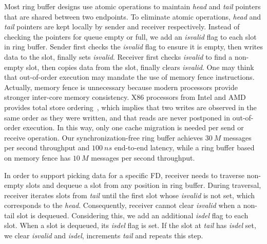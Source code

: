 Most ring buffer designs use atomic operations to maintain \textit{head} and \textit{tail} pointers that are shared between two endpoints. To eliminate atomic operations, \textit{head} and \textit{tail} pointers are kept locally by sender and receiver respectively. Instead of checking the pointers for queue empty or full, we add an \textit{isvalid} flag to each slot in ring buffer. Sender first checks the \textit{isvalid} flag to ensure it is empty, then writes data to the slot, finally sets \textit{isvalid}. Receiver first checks \textit{isvalid} to find a non-empty slot, then copies data from the slot, finally clears \textit{isvalid}. One may think that out-of-order execution may mandate the use of memory fence instructions. Actually, memory fence is unnecessary because modern processors provide stronger inter-core memory consistency. X86 processors from Intel and AMD provides total store ordering~\cite{sewell2010x86,intel-manual}, which implies that two writes are observed in the same order as they were written, and that reads are never postponed in out-of-order execution. In this way, only one cache migration is needed per send or receive operation. Our synchronization-free ring buffer achieves $30~M$ messages per second throughput and $100~ns$ end-to-end latency, while a ring buffer based on memory fence has $10~M$ messages per second throughput.

In order to support picking data for a specific FD, receiver needs to traverse non-empty slots and dequeue a slot from any position in ring buffer. During traversal, receiver iterates slots from \textit{tail} until the first slot whose \textit{isvalid} is not set, which corresponds to the \textit{head}. Consequently, receiver cannot clear \textit{isvalid} when a non-tail slot is dequeued. Considering this, we add an additional \textit{isdel} flag to each slot. When a slot is dequeued, its \textit{isdel} flag is set. If the slot at \textit{tail} has \textit{isdel} set, we clear \textit{isvalid} and \textit{isdel}, increments \textit{tail} and repeats this step.




